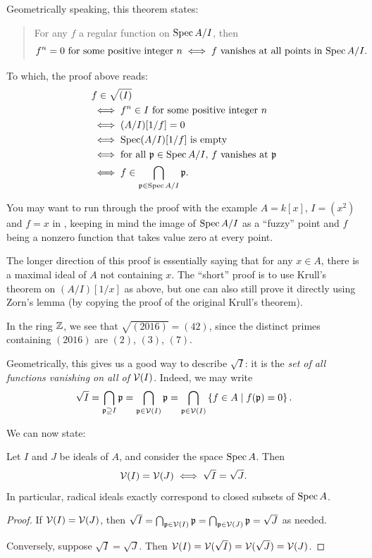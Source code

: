 Geometrically speaking, this theorem states:
\begin{quote}
	For any $f$ a regular function on $\operatorname{Spec} A/I$, then
	\[
		\text{$f^n = 0$ for some positive integer $n$}
		\iff \text{$f$ vanishes at all points in $\operatorname{Spec} A/I$}.
	\]
\end{quote}
To which, the proof above reads:
\begin{align*}
	& f \in \sqrt{(I)} \\
	& \iff \text{$f^n \in I$ for some positive integer $n$} \\
	& \iff (A/I)[1/f] = 0 \\
	& \iff \text{$\operatorname{Spec} (A/I)[1/f]$ is empty} \\
	& \iff \text{for all $\mathfrak p \in \operatorname{Spec} A/I$, $f$ vanishes at $\mathfrak p$} \\
	& \iff f \in \bigcap_{\mathfrak p \in \operatorname{Spec} A/I} \mathfrak p.
\end{align*}

You may want to run through the proof with the example $A = k[x]$, $I = (x^2)$ and $f = x$
in ,
keeping in mind the image of $\operatorname{Spec} A/I$ as a ``fuzzy'' point and $f$ being a nonzero function that
takes value zero at every point.

\begin{remark}
	The longer direction of this proof is essentially
	saying that for any $x \in A$,
	there is a maximal ideal of $A$ not containing $x$.
	The ``short'' proof is to use Krull's theorem on $(A/I)[1/x]$ as above,
	but one can also still prove it directly using Zorn's lemma
	(by copying the proof of the original Krull's theorem).
\end{remark}

\begin{example}
	[$\sqrt{(2016)} = (42)$ in $\ZZ$]
	In the ring $\ZZ$, we see that $\sqrt{(2016)} = (42)$,
	since the distinct primes containing $(2016)$
	are $(2)$, $(3)$, $(7)$.
\end{example}

Geometrically, this gives us a good way to describe $\sqrt I$:
it is the \emph{set of all functions vanishing on all of $\mathcal V(I)$}.
Indeed, we may write
\[ \sqrt I = \bigcap_{\mathfrak p \supseteq I} \mathfrak p
	= \bigcap_{\mathfrak p \in \mathcal V(I)} \mathfrak p
	= \bigcap_{\mathfrak p \in \mathcal V(I)} \left\{ f \in A \mid f(\mathfrak p) = 0 \right\}. \]

We can now state:
\begin{theorem}
	Let $I$ and $J$ be ideals of $A$,
	and consider the space $\operatorname{Spec} A$.
	Then
	\[ \mathcal V(I) = \mathcal V(J) \iff \sqrt I = \sqrt J. \]
	In particular, radical ideals exactly
	correspond to closed subsets of $\operatorname{Spec} A$.
\end{theorem}
\begin{proof}
	If $\mathcal V(I) = \mathcal V(J)$,
	then $\sqrt I = \bigcap_{\mathfrak p \in \mathcal V(I)} \mathfrak p =
	\bigcap_{\mathfrak p \in \mathcal V(J)} \mathfrak p = \sqrt J$ as needed.

	Conversely, suppose $\sqrt I = \sqrt J$.
	Then $\mathcal V(I) = \mathcal V(\sqrt I) = \mathcal V(\sqrt J) = \mathcal V(J)$.
\end{proof}

